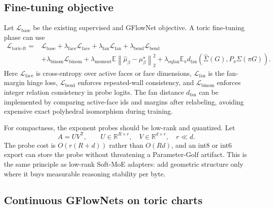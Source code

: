 \documentclass[11pt]{article}
\theoremstyle{definition}
\theoremstyle{plain}
\theoremstyle{remark}
\numberwithin{equation}{section}
\newcommand{\R}{\mathbb{R}}
\newcommand{\Eop}{\mathbb{E}}
\newcommand{\norm}[1]{\left\lVert #1\right\rVert}
\newcommand{\transpose}{^{\mathsf T}}
\begin{document}
\subsection{Fine-tuning objective}

Let $\mathcal L_{\mathrm{base}}$ be the existing supervised and GFlowNet objective.  A toric fine-tuning phase can use
\begin{equation}
\begin{split}
  \mathcal L_{\mathrm{toric}\text{-}\mathrm{ft}}
  ={}&\mathcal L_{\mathrm{base}}
  +\lambda_{\mathrm{face}}\mathcal L_{\mathrm{face}}
  +\lambda_{\mathrm{fan}}\mathcal L_{\mathrm{fan}}
  +\lambda_{\mathrm{bend}}\mathcal L_{\mathrm{bend}}\\
  &+\lambda_{\mathrm{binom}}\mathcal L_{\mathrm{binom}}
  +\lambda_{\mathrm{moment}}\Eop\norm{\widehat\mu_\beta-\mu_\beta^\star}_2^2
  +\lambda_{\mathrm{eqfan}}\Eop_\pi d_{\mathrm{fan}}(\widehat\Sigma(G),P_\pi\widehat\Sigma(\pi G)).
\end{split}
\end{equation}
Here $\mathcal L_{\mathrm{face}}$ is cross-entropy over active faces or face dimensions, $\mathcal L_{\mathrm{fan}}$ is the fan-margin hinge loss, $\mathcal L_{\mathrm{bend}}$ enforces repeated-wall consistency, and $\mathcal L_{\mathrm{binom}}$ enforces integer relation consistency in probe logits.  The fan distance $d_{\mathrm{fan}}$ can be implemented by comparing active-face ids and margins after relabeling, avoiding expensive exact polyhedral isomorphism during training.

For compactness, the exponent probes should be low-rank and quantized.  Let
\begin{equation}
  A=UV\transpose,\qquad U\in\R^{R\times r},\quad V\in\R^{d\times r},\quad r\ll d.
\end{equation}
The probe cost is $O(r(R+d))$ rather than $O(Rd)$, and an int8 or int6 export can store the probe without threatening a Parameter-Golf artifact.  This is the same principle as low-rank Soft-MoE adapters: add geometric structure only where it buys measurable reasoning stability per byte.

\subsection{Continuous GFlowNets on toric charts}
\end{document}
